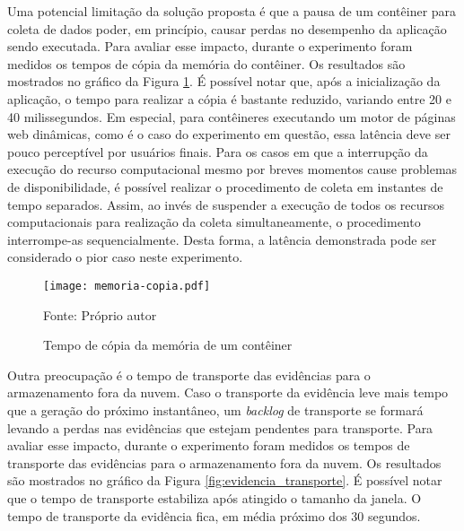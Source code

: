 %
%
%

Uma potencial limitação da solução proposta é que a pausa de um contêiner para coleta de dados poder, em princípio, causar perdas no desempenho da aplicação sendo executada. 
%
Para avaliar esse impacto, durante o experimento foram medidos os tempos de cópia da memória do contêiner.
%
Os resultados são mostrados no gráfico da Figura \ref{fig:memoria-copia}.
%
É possível notar que, após a inicialização da aplicação, o tempo para realizar a cópia é bastante reduzido, variando entre 20 e 40 milissegundos. 
%
Em especial, para contêineres executando um motor de páginas web dinâmicas, como é o caso do experimento em questão, essa latência deve ser pouco perceptível por usuários finais.
%
Para os casos em que a interrupção da execução do recurso computacional mesmo por breves momentos cause problemas de disponibilidade, é possível realizar o procedimento de coleta em instantes de tempo separados.
%
Assim, ao invés de suspender a execução de todos os recursos computacionais para realização da coleta simultaneamente, o procedimento interrompe-as sequencialmente.
%
Desta forma, a latência demonstrada pode ser considerado o pior caso neste experimento.

\begin{figure}[htb!]
\footnotesize
\caption{Tempo de cópia da memória de um contêiner}
\texttt{[image: memoria-copia.pdf]}
\centering
\label{fig:memoria-copia}
\begin{center}
Fonte: Próprio autor 
\end{center}
\end{figure}


Outra preocupação é o tempo de transporte das evidências para o armazenamento fora da nuvem.
%
Caso o transporte da evidência leve mais tempo que a geração do próximo instantâneo, um \textit{backlog} de transporte se formará levando a perdas nas evidências que estejam pendentes para transporte.
%
Para avaliar esse impacto, durante o experimento foram medidos os tempos de transporte das evidências para o armazenamento fora da nuvem.
%
Os resultados são mostrados no gráfico da Figura \ref{fig:evidencia_transporte}.
%
É possível notar que o tempo de transporte estabiliza após atingido o tamanho da janela. O tempo de transporte da evidência fica, em média próximo dos 30 segundos. 

